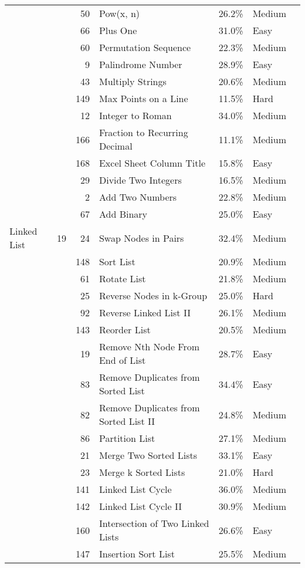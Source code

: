 \documentclass[9pt,b5paper]{article}
\begin{document}
\begin{center}
\begin{tabular}{lrrllll}
 &  & 50 & Pow(x, n) & 26.2\% & Medium & \\
 &  & 66 & Plus One & 31.0\% & Easy & \\
 &  & 60 & Permutation Sequence & 22.3\% & Medium & \\
 &  & 9 & Palindrome Number & 28.9\% & Easy & \\
 &  & 43 & Multiply Strings & 20.6\% & Medium & \\
 &  & 149 & Max Points on a Line & 11.5\% & Hard & \\
 &  & 12 & Integer to Roman & 34.0\% & Medium & \\
 &  & 166 & Fraction to Recurring Decimal & 11.1\% & Medium & \\
 &  & 168 & Excel Sheet Column Title & 15.8\% & Easy & \\
 &  & 29 & Divide Two Integers & 16.5\% & Medium & \\
 &  & 2 & Add Two Numbers & 22.8\% & Medium & \\
 &  & 67 & Add Binary & 25.0\% & Easy & \\
\hline
Linked List & 19 & 24 & Swap Nodes in Pairs & 32.4\% & Medium & \\
 &  & 148 & Sort List & 20.9\% & Medium & \\
 &  & 61 & Rotate List & 21.8\% & Medium & \\
 &  & 25 & Reverse Nodes in k-Group & 25.0\% & Hard & \\
 &  & 92 & Reverse Linked List II & 26.1\% & Medium & \\
 &  & 143 & Reorder List & 20.5\% & Medium & \\
 &  & 19 & Remove Nth Node From End of List & 28.7\% & Easy & \\
 &  & 83 & Remove Duplicates from Sorted List & 34.4\% & Easy & \\
 &  & 82 & Remove Duplicates from Sorted List II & 24.8\% & Medium & \\
 &  & 86 & Partition List & 27.1\% & Medium & \\
 &  & 21 & Merge Two Sorted Lists & 33.1\% & Easy & \\
 &  & 23 & Merge k Sorted Lists & 21.0\% & Hard & \\
 &  & 141 & Linked List Cycle & 36.0\% & Medium & \\
 &  & 142 & Linked List Cycle II & 30.9\% & Medium & \\
 &  & 160 & Intersection of Two Linked Lists & 26.6\% & Easy & \\
 &  & 147 & Insertion Sort List & 25.5\% & Medium & \\

\end{tabular}
\end{center}
\end{document}
